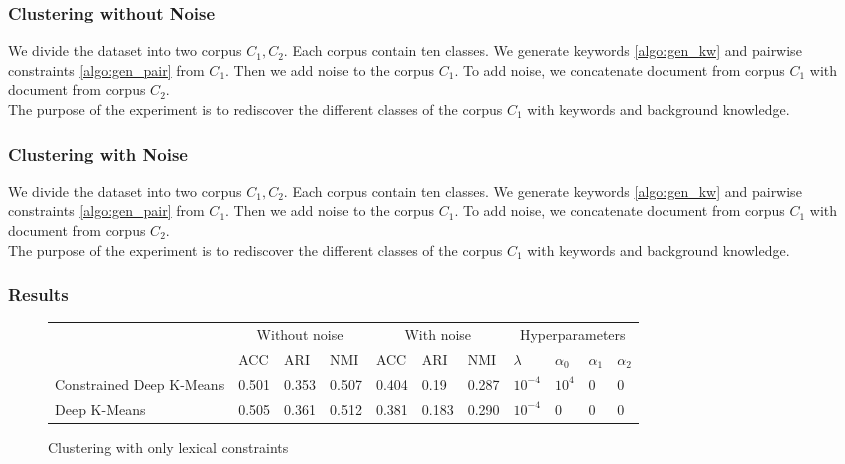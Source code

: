\subsubsection{Clustering without Noise}
We divide the dataset into two corpus $C_1, C_2$. Each corpus contain
ten classes. We generate keywords \ref{algo:gen_kw} and pairwise
constraints \ref{algo:gen_pair} from $C_1$. Then we add noise to the corpus
$C_1$. To add noise, we concatenate document from corpus $C_1$ with document
from corpus $C_2$.
\\The purpose of the experiment is to rediscover the different classes of the
corpus $C_1$ with keywords and background knowledge.

\subsubsection{Clustering with Noise}
We divide the dataset into two corpus $C_1, C_2$. Each corpus contain
ten classes. We generate keywords \ref{algo:gen_kw} and pairwise
constraints \ref{algo:gen_pair} from $C_1$. Then we add noise to the corpus
$C_1$. To add noise, we concatenate document from corpus $C_1$ with document
from corpus $C_2$.
\\The purpose of the experiment is to rediscover the different classes of the
corpus $C_1$ with keywords and background knowledge.

\subsubsection{Results}
\begin{figure}[!h]
  \centering
  \begin{tabular}{| l | l | l | l | l | l | l | l | l | l | l |}
    \hline
    & \multicolumn{3}{|c|}{Without noise} & \multicolumn{3}{|c|}{With noise} & \multicolumn{4}{|c|}{Hyperparameters}  \\
    & ACC &ARI & NMI & ACC & ARI &NMI & $\lambda$ & $\alpha_0$ & $\alpha_1$ & $\alpha_2$\\ \hline
    Constrained Deep K-Means & 0.501& 0.353 & 0.507 & 0.404& 0.19 & 0.287 & $10^{-4}$ & $10^{4}$ & 0 & 0 \\ \hline
    Deep K-Means& 0.505 & 0.361 & 0.512 & 0.381 & 0.183 & 0.290 &   $10^{-4}$ & 0 & 0 & 0\\ \hline
  \end{tabular}
\caption{\label{tab1}Clustering with only lexical constraints}
\end{figure}